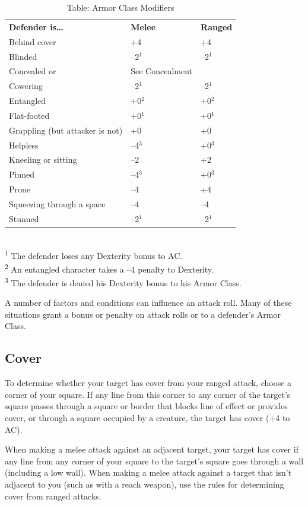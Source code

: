 \begin{table}[]
\sffamily
\caption{Table: Armor Class Modifiers}
\begin{tabular}{lll}
\textbf{Defender is…} & \textbf{Melee} & \textbf{Ranged}\\
Behind cover & +4 & +4\\
Blinded & --2\(^{1}\) & --2\(^{1}\)\\
Concealed or  & See Concealment\\
Cowering & --2\(^{1}\) & --2\(^{1}\)\\
Entangled & +0\(^{2}\) & +0\(^{2}\)\\
Flat-footed & +0\(^{1}\) & +0\(^{1}\)\\
Grappling (but attacker is not) & +0 & +0\\
Helpless & --4\(^{3}\) & +0\(^{3}\)\\
Kneeling or sitting & --2 & +2\\
Pinned & --4\(^{3}\) & +0\(^{3}\)\\
Prone & --4 & +4\\
Squeezing through a space & --4 & --4\\
Stunned & --2\(^{1}\) & --2\(^{1}\)\\
\end{tabular}\\
\textsuperscript{1} The defender loses any Dexterity bonus to AC.\\
\textsuperscript{2} An entangled character takes a --4 penalty to Dexterity.\\
\textsuperscript{3} The defender is denied his Dexterity bonus to his Armor Class.\\
\end{table}


A number of factors and conditions can influence an attack roll. Many of these situations grant a bonus or penalty on attack rolls or to a defender's Armor Class.

\subsection{Cover}

				
To determine whether your target has cover from your ranged attack, choose a corner of your square. If any line from this corner to any corner of the target's square passes through a square or border that blocks line of effect or provides cover, or through a square occupied by a creature, the target has cover (+4 to AC).
				
When making a melee attack against an adjacent target, your target has cover if any line from any corner of your square to the target's square goes through a wall (including a low wall). When making a melee attack against a target that isn't adjacent to you (such as with a reach weapon), use the rules for determining cover from ranged attacks.
				
